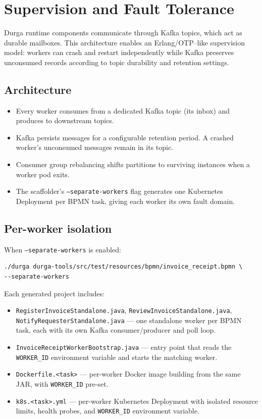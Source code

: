 \section{Supervision and Fault Tolerance}
\label{sec:Supervision}

Durga runtime components communicate through Kafka topics, which act as
durable mailboxes. This architecture enables an Erlang/OTP--like supervision
model: workers can crash and restart independently while Kafka preserves
unconsumed records according to topic durability and retention settings.

\subsection{Architecture}

\begin{itemize}
\item Every worker consumes from a dedicated Kafka topic (its inbox) and
      produces to downstream topics.
\item Kafka persists messages for a configurable retention period. A crashed
      worker's unconsumed messages remain in its topic.
\item Consumer group rebalancing shifts partitions to surviving instances when
      a worker pod exits.
\item The scaffolder's \texttt{--separate-workers} flag generates one
      Kubernetes Deployment per BPMN task, giving each worker its own
      fault domain.
\end{itemize}

\subsection{Per-worker isolation}

When \texttt{--separate-workers} is enabled:

\begin{verbatim}
./durga durga-tools/src/test/resources/bpmn/invoice_receipt.bpmn \
--separate-workers
\end{verbatim}

Each generated project includes:

\begin{itemize}
\item \texttt{RegisterInvoiceStandalone.java}, \texttt{ReviewInvoiceStandalone.java}, \\
      \texttt{NotifyRequesterStandalone.java} --- one standalone worker per BPMN
      task, each with its own Kafka consumer/producer and poll loop.
\item \texttt{InvoiceReceiptWorkerBootstrap.java} --- entry point that reads
      the \texttt{WORKER\_ID} environment variable and starts the matching
      worker.
\item \texttt{Dockerfile.<task>} --- per-worker Docker image building from
      the same JAR, with \texttt{WORKER\_ID} pre-set.
\item \texttt{k8s.<task>.yml} --- per-worker Kubernetes Deployment with
      isolated resource limits, health probes, and \texttt{WORKER\_ID}
      environment variable.
\end{itemize}

